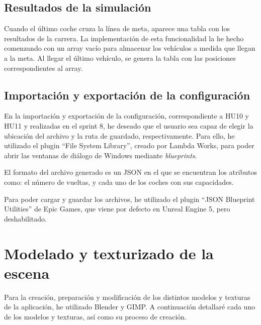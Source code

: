 \subsection{Resultados de la simulación}


Cuando el último coche cruza la línea de meta, aparece una tabla con los resultados de la carrera. La implementación de esta funcionalidad la he hecho comenzando con un array vacío para almacenar los vehículos a medida que llegan a la meta. Al llegar el último vehículo, se genera la tabla con las posiciones correspondientes al array.


\subsection{Importación y exportación de la configuración}

En la importación y exportación de la configuración, correspondiente a HU10 y HU11 y realizadas en el sprint 8, he deseado que el usuario sea capaz de elegir la ubicación del archivo y la ruta de guardado, respectivamente. Para ello, he utilizado el plugin ``File System Library''\cite{plugin-dialog}, creado por Lambda Works, para poder abrir las ventanas de diálogo de Windows mediante \textit{blueprints}.

\bigskip

El formato del archivo generado es un JSON en el que se encuentran los atributos como: el número de vueltas, y cada uno de los coches con sus capacidades.

\bigskip

Para poder cargar y guardar los archivos, he utilizado el plugin ``JSON Blueprint Utilities'' de Epic Games, que viene por defecto en Unreal Engine 5, pero deshabilitado.


\section{Modelado y texturizado de la escena}

Para la creación, preparación y modificación de los distintos modelos y texturas de la aplicación, he utilizado Blender\cite{blender} y GIMP\cite{gimp}. A continuación detallaré cada uno de los modelos y texturas, así como su proceso de creación.

